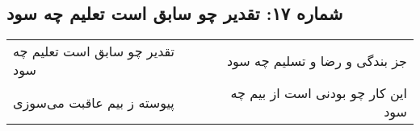 \begin{center}
\section*{شماره ۱۷: تقدیر چو سابق است تعلیم چه سود}
\label{sec:017}
\begin{longtable}{l p{0.5cm} r}
تقدیر چو سابق است تعلیم چه سود
&&
جز بندگی و رضا و تسلیم چه سود
\\
پیوسته ز بیم عاقبت می‌سوزی
&&
این کار چو بودنی است از بیم چه سود
\\
\end{longtable}
\end{center}
